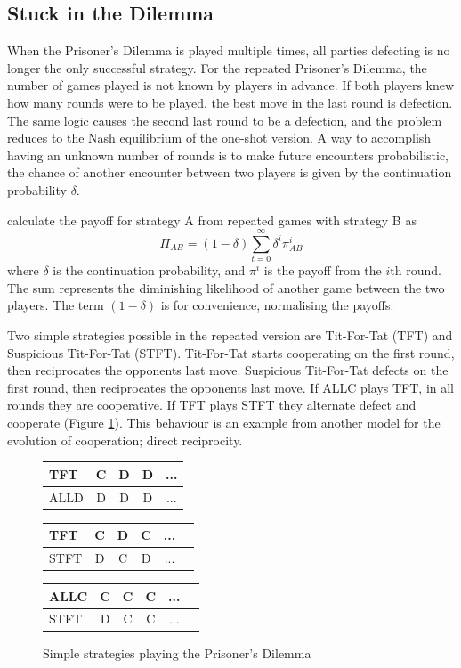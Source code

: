 \documentclass[a4paper,11pt,bcshonoursthesis,singlespace,twoside,thesisdraft,pdflatex]{cssethesis}
\begin{document}
\subsection{Stuck in the Dilemma}
When the Prisoner's Dilemma is played multiple times, all parties defecting is no longer the only successful strategy. 
For the repeated Prisoner's Dilemma, the number of games played is not known by players in advance. 
If both players knew how many rounds were to be played, the best move in the last round is defection. 
The same logic causes the second last round to be a defection, and the problem reduces to the Nash equilibrium of the one-shot version. 
A way to accomplish having an unknown number of rounds is to make future encounters probabilistic, the chance of another encounter between two players is given by the continuation probability $\delta$.

\citet{garcia:PLoSOne:2012} calculate the payoff for strategy A from repeated games with strategy B as
\begin{equation}
\label{eqn:repeatedPayoff}
\Pi_{AB}=(1-\delta)\sum^{\infty}_{t=0} \delta^i\pi^i_{AB}
\end{equation}
where $\delta$ is the continuation probability, and $\pi^i$ is the payoff from the $i$th round. 
The sum represents the diminishing likelihood of another game between the two players. 
The term $(1-\delta)$ is for convenience, normalising the payoffs.
 
Two simple strategies possible in the repeated version are Tit-For-Tat (TFT) and Suspicious Tit-For-Tat (STFT). 
Tit-For-Tat starts cooperating on the first round, then reciprocates the opponents last move. 
Suspicious Tit-For-Tat defects on the first round, then reciprocates the opponents last move. 
If ALLC plays TFT, in all rounds they are cooperative.  
If TFT plays STFT they alternate defect and cooperate (Figure \ref{table:reciprocity}). 
This behaviour is an example from another model for the evolution of cooperation; direct reciprocity. 

\begin{figure}[h]
\centering
\captionsetup{justification=centering}
\begin{tabular}{|l|c|c|c|c|}
\hline
TFT & C & D & D&...\\
\hline
ALLD & D & D &D&...\\
\hline
\end{tabular}\hfill
\begin{tabular}{|l|c|c|c|c|c|}
\hline
TFT & C & D&C&...\\
\hline
STFT & D & C&D&...\\
\hline
\end{tabular}\hfill
\begin{tabular}{|l|c|c|c|c|c|}
\hline
ALLC & C & C&C&...\\
\hline
STFT & D & C&C&...\\
\hline
\end{tabular}\hfill
\caption{Simple strategies playing the Prisoner's Dilemma}
\label{table:reciprocity}
\end{figure}
\end{document}
